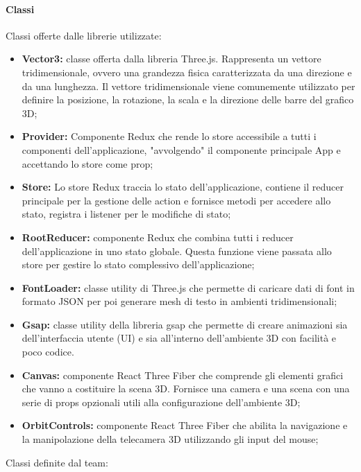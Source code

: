 \paragraph{Classi}
    Classi offerte dalle librerie utilizzate:
    \begin{itemize}
        \item \textbf{Vector3:} classe offerta dalla libreria Three.js. Rappresenta un vettore tridimensionale, ovvero
        una grandezza fisica caratterizzata da una direzione e da una lunghezza. Il vettore tridimensionale
        viene comunemente utilizzato per definire la posizione, la rotazione, la scala e la direzione
        delle barre del grafico 3D;
        \item \textbf{Provider:} Componente Redux che rende lo store accessibile a tutti i componenti dell'applicazione, "avvolgendo" il componente principale App e accettando lo store come prop;
        \item \textbf{Store:} Lo store Redux traccia lo stato dell'applicazione, contiene il reducer principale per la gestione delle action e fornisce metodi per accedere allo stato,
        registra i listener per le modifiche di stato;
        \item \textbf{RootReducer:} componente Redux che combina tutti i reducer dell’applicazione in uno stato
        globale. Questa funzione viene passata allo store per gestire lo stato complessivo dell’applicazione;
        \item \textbf{FontLoader:} classe utility di Three.js che permette di caricare dati di font in formato JSON per poi generare mesh di testo in ambienti tridimensionali;
        \item \textbf{Gsap:} classe utility della libreria gsap che permette di creare animazioni sia dell'interfaccia utente (UI) e sia all'interno dell'ambiente 3D con facilità e poco codice.
        \item \textbf{Canvas:} componente React Three Fiber che comprende gli elementi grafici che vanno a costituire la scena 3D. 
        Fornisce una camera e una scena con una serie di props opzionali utili alla configurazione dell’ambiente 3D;
        \item \textbf{OrbitControls:} componente React Three Fiber che abilita la navigazione e la manipolazione della telecamera 3D utilizzando gli input del mouse;
    \end{itemize}
    Classi definite dal team:
